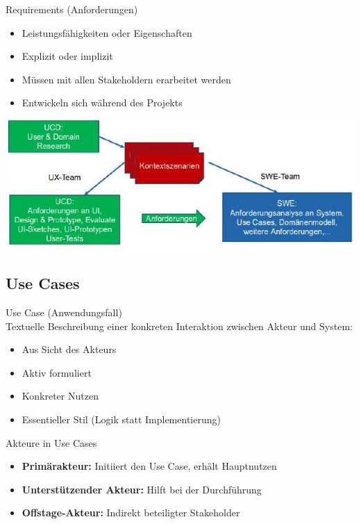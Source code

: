 \begin{definition}{Requirements (Anforderungen)}
\begin{itemize}
    \item Leistungsfähigkeiten oder Eigenschaften
    \item Explizit oder implizit
    \item Müssen mit allen Stakeholdern erarbeitet werden
    \item Entwickeln sich während des Projekts
\end{itemize}
\includegraphics[width=\linewidth]{images/2024_12_29_0d1d7b5551ea1b4b41bdg-04(1)}
\end{definition}

\subsection{Use Cases}

\begin{definition}{Use Case (Anwendungsfall)}\\
Textuelle Beschreibung einer konkreten Interaktion zwischen Akteur und System:
\begin{itemize}
    \item Aus Sicht des Akteurs
    \item Aktiv formuliert
    \item Konkreter Nutzen
    \item Essentieller Stil (Logik statt Implementierung)
\end{itemize}
\end{definition}

\begin{theorem}{Akteure in Use Cases}
\begin{itemize}
    \item \textbf{Primärakteur:} Initiiert den Use Case, erhält Hauptnutzen
    \item \textbf{Unterstützender Akteur:} Hilft bei der Durchführung
    \item \textbf{Offstage-Akteur:} Indirekt beteiligter Stakeholder
\end{itemize}
\end{theorem}

